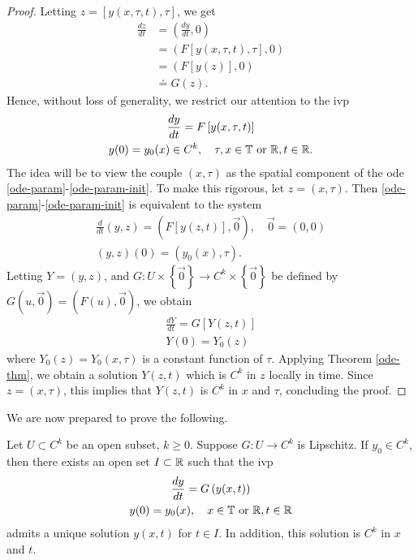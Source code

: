 %
\begin{proof}
  Letting $z = \left[ y(x, \tau, t), \tau \right]$, we get
  \begin{equation*}
  \begin{split}
  \frac{dz}{dt}
  & = \left( \frac{dy}{dt}, 0 \right)
  \\
  & = \left( F\left[ y(x,\tau, t), \tau \right], 0 \right)
  \\
  & = \left( F[y(z)], 0 \right)
  \\
  & \doteq G(z).
  \end{split}
  \end{equation*}
  Hence, without loss of generality, we restrict our attention to the ivp
\begin{gather}
  \label{ode-param}
\frac{dy}{dt} = F \left [ y(x, \tau, t) \right]
\\
y(0) = y_{0}(x) \in C^{k}, \quad \tau, x \in \mathbb{T} \ \text{or} \
\mathbb{R}, t \in \mathbb{R}.
\label{ode-param-init}
\end{gather}
  The idea will be to view the couple
  $(x, \tau)$ as the spatial component of the ode
  \eqref{ode-param}-\eqref{ode-param-init}.
  To make this rigorous, let $z = (x, \tau)$. Then
  \eqref{ode-param}-\eqref{ode-param-init} is equivalent to the system
  \begin{gather*}
    \frac{d}{dt}(y, z) = \left( F[y(z,t)], \vec{0} \right), \quad \vec 0 =
    (0, 0)
  \\
  (y, z)(0) = \left ( y_{0}(x), \tau \right ).
  \end{gather*}
  Letting $Y = (y,z)$, and $G: U \times \left\{ \vec{0} \right\} 
  \to C^{k} \times \left\{ \vec{0} \right\}$ be defined
  by $G(u, \vec{0}) = \left( F(u), \vec{0} \right)$, we obtain
  \begin{gather*}
      \frac{dY}{dt} = G\left[ Y(z,t) \right]
      \\
      Y(0) = Y_{0}(z)
  \end{gather*}
%
where $Y_{0}(z) = Y_{0}(x, \tau)$ is a constant function of $\tau$. 
Applying Theorem \ref{ode-thm},  we obtain a solution $Y(z,t)$ which is
$C^{k}$ in $z$ locally in time. Since $z = (x, \tau)$, this implies that $Y(z,t)$ is
$C^{k}$ in $x$ and $\tau$, concluding the proof. 
%
\end{proof}
%
%
We are now prepared to prove the following. 
\begin{theorem}
  Let $U \subset C^{k}$ be an open subset, $k \ge 0$. Suppose $G: U \to C^{k}$
  is Lipschitz. If $y_{0} \in C^{k}$, then there exists an open set $I \subset
  \mathbb{R}$
such that the ivp 
\begin{gather}
\frac{dy}{dt} = G\left( y(x,t) \right)
\label{cc}
\\
y(0) = y_{0}(x), \quad x \in \mathbb{T} \ \text{or} \ \mathbb{R},t \in \mathbb{R}
\label{dd}
\end{gather}
%
%
admits a unique solution $y(x,t)$ for $t \in I$. In addition,
this solution is $C^{k}$ in $x$ and $t$.
\label{thm:reg-result}
\end{theorem}
